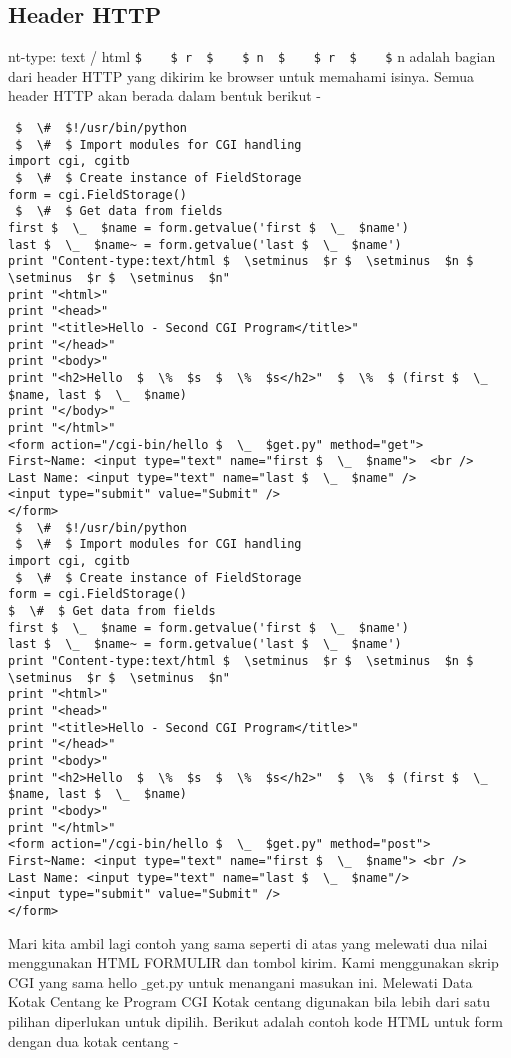 \begin {enumerate}
\begin {enumerate}
\subsection{Header HTTP}
nt-type: text / html  \verb|$    $ r  $    $ n  $    $ r  $    $| n adalah bagian dari header HTTP yang dikirim ke browser untuk memahami isinya. Semua header HTTP akan berada dalam bentuk berikut -
\begin{verbatim}
 $  \#  $!/usr/bin/python
 $  \#  $ Import modules for CGI handling
import cgi, cgitb
 $  \#  $ Create instance of FieldStorage
form = cgi.FieldStorage()
 $  \#  $ Get data from fields
first $  \_  $name = form.getvalue('first $  \_  $name')
last $  \_  $name~ = form.getvalue('last $  \_  $name')
print "Content-type:text/html $  \setminus  $r $  \setminus  $n $  \setminus  $r $  \setminus  $n"
print "<html>"
print "<head>"
print "<title>Hello - Second CGI Program</title>"
print "</head>"
print "<body>"
print "<h2>Hello  $  \%  $s  $  \%  $s</h2>"  $  \%  $ (first $  \_  $name, last $  \_  $name)
print "</body>"
print "</html>"
<form action="/cgi-bin/hello $  \_  $get.py" method="get">
First~Name: <input type="text" name="first $  \_  $name">  <br />
Last Name: <input type="text" name="last $  \_  $name" />
<input type="submit" value="Submit" />
</form>
 $  \#  $!/usr/bin/python
 $  \#  $ Import modules for CGI handling
import cgi, cgitb
 $  \#  $ Create instance of FieldStorage
form = cgi.FieldStorage()
$  \#  $ Get data from fields
first $  \_  $name = form.getvalue('first $  \_  $name')
last $  \_  $name~ = form.getvalue('last $  \_  $name')
print "Content-type:text/html $  \setminus  $r $  \setminus  $n $  \setminus  $r $  \setminus  $n"
print "<html>"
print "<head>"
print "<title>Hello - Second CGI Program</title>"
print "</head>"
print "<body>"
print "<h2>Hello  $  \%  $s  $  \%  $s</h2>"  $  \%  $ (first $  \_  $name, last $  \_  $name)
print "<body>"
print "</html>"
<form action="/cgi-bin/hello $  \_  $get.py" method="post">
First~Name: <input type="text" name="first $  \_  $name"> <br />
Last Name: <input type="text" name="last $  \_  $name"/>
<input type="submit" value="Submit" />
</form>
\end{verbatim}
Mari kita ambil lagi contoh yang sama seperti di atas yang melewati dua nilai menggunakan HTML FORMULIR dan tombol kirim. Kami menggunakan skrip CGI yang sama hello $  \_  $get.py untuk menangani masukan ini.
Melewati Data Kotak Centang ke Program CGI
Kotak centang digunakan bila lebih dari satu pilihan diperlukan untuk dipilih.
Berikut adalah contoh kode HTML untuk form dengan dua kotak centang -

\end{enumerate}
\end{enumerate}
